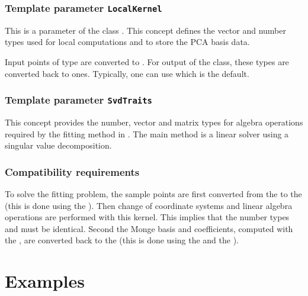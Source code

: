 \subsubsection{Template parameter \texttt{LocalKernel}}
This is a parameter of the class 
. 
This concept defines the vector and number types used for local
computations and to store the PCA basis data.  

Input points of type
 are converted to
. For output of the  class,
these types are converted back to  ones.  Typically,
one can use
 which is the default.

\subsubsection{Template parameter \texttt{SvdTraits}}

This concept provides the number, vector and matrix types for algebra
operations required by the fitting method in
. The main method is a linear solver using a singular value decomposition.

\subsubsection{Compatibility requirements}

To solve the fitting problem, the sample points are first converted
from the  to the  (this is done using
the ). Then change of coordinate
systems and linear algebra operations are performed with this
kernel. This implies that the number types  and
 must be identical.
Second the Monge basis and coefficients, computed with the
, are converted back to the  
(this is done using the  and the
).


\section{Examples} 

